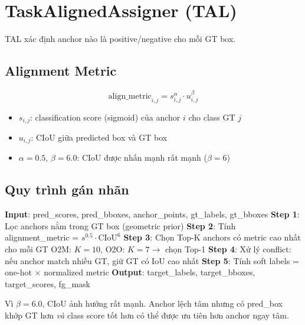 \section{TaskAlignedAssigner (TAL)}
\label{sec:tal}

TAL xác định anchor nào là positive/negative cho mỗi GT box.

\subsection{Alignment Metric}

\begin{equation}
    \text{align\_metric}_{i,j} = s_{i,j}^{\alpha} \cdot u_{i,j}^{\beta}
    \label{eq:align_metric}
\end{equation}

\begin{itemize}
    \item $s_{i,j}$: classification score (sigmoid) của anchor $i$ cho class GT $j$
    \item $u_{i,j}$: CIoU giữa predicted box và GT box
    \item $\alpha = 0.5$, $\beta = 6.0$: CIoU được nhấn mạnh rất mạnh ($\beta = 6$)
\end{itemize}

\subsection{Quy trình gán nhãn}

\begin{algorithm}[H]
\caption{TaskAlignedAssigner}
\label{alg:tal}
\begin{algorithmic}[1]
\State \textbf{Input}: pred\_scores, pred\_bboxes, anchor\_points, gt\_labels, gt\_bboxes
\State \textbf{Step 1}: Lọc anchors nằm trong GT box (geometric prior)
\State \textbf{Step 2}: Tính alignment\_metric = $s^{0.5} \cdot \text{CIoU}^{6}$
\State \textbf{Step 3}: Chọn Top-K anchors có metric cao nhất cho mỗi GT
\Statex \quad\quad O2M: $K=10$, O2O: $K=7 \to$ chọn Top-1
\State \textbf{Step 4}: Xử lý conflict: nếu anchor match nhiều GT, giữ GT có IoU cao nhất
\State \textbf{Step 5}: Tính soft labels = one-hot $\times$ normalized metric
\State \textbf{Output}: target\_labels, target\_bboxes, target\_scores, fg\_mask
\end{algorithmic}
\end{algorithm}

\begin{notebox}
Vì $\beta = 6.0$, CIoU ảnh hưởng rất mạnh. Anchor lệch tâm nhưng có pred\_box khớp GT hơn \textit{và} class score tốt hơn có thể được ưu tiên hơn anchor ngay tâm.
\end{notebox}

